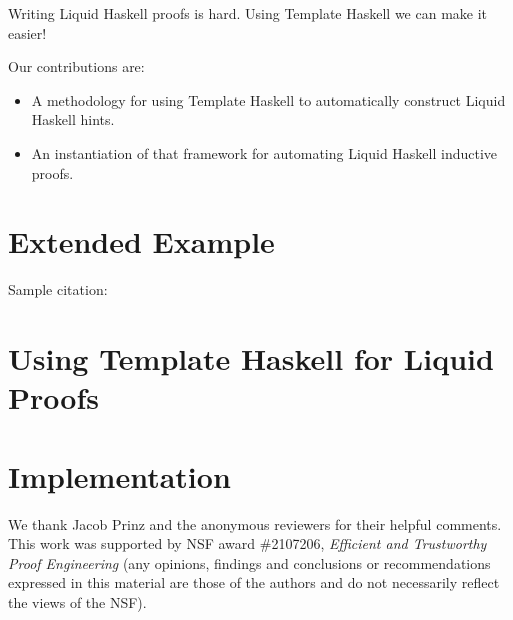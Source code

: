 \documentclass[sigplan,screen]{acmart}
\begin{document}
Writing Liquid Haskell proofs is hard.
Using Template Haskell we can make it easier!

Our contributions are:
\begin{itemize}
\item A methodology for using Template Haskell to automatically construct Liquid Haskell hints.
\item An instantiation of that framework for automating Liquid Haskell inductive proofs.
\end{itemize}

\section{Extended Example}


Sample citation: \cite{liu20typeclasses}

\section{Using Template Haskell for Liquid Proofs}

\section{Implementation}

\begin{acks}
  We thank Jacob Prinz and the anonymous reviewers for their helpful
  comments.  This work was supported by NSF award \#2107206, {\em
    Efficient and Trustworthy Proof Engineering} (any opinions,
  findings and conclusions or recommendations expressed in this
  material are those of the authors and do not necessarily reflect the
  views of the NSF).
\end{acks}





\end{document}
